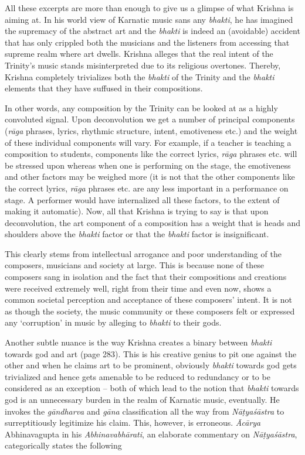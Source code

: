 All these excerpts are more than enough to give us a glimpse of what Krishna is aiming at. In his world view of Karnatic music sans any \textit{bhakti}, he has imagined the supremacy of the abstract art and the \textit{bhakti} is indeed an (avoidable) accident that has only crippled both the musicians and the listeners from accessing that supreme realm where art dwells. Krishna alleges that the real intent of the Trinity’s music stands misinterpreted due to its religious overtones. Thereby, Krishna completely trivializes both the \textit{bhakti} of the Trinity and the \textit{bhakti} elements that they have suffused in their compositions.

In other words, any composition by the Trinity can be looked at as a highly convoluted signal. Upon deconvolution we get a number of principal components (\textit{rāga} phrases, lyrics, rhythmic structure, intent, emotiveness etc.) and the weight of these individual components will vary. For example, if a teacher is teaching a composition to students, components like the correct lyrics, \textit{rāga} phrases etc. will be stressed upon whereas when one is performing on the stage, the emotiveness and other factors may be weighed more (it is not that the other components like the correct lyrics, \textit{rāga} phrases etc. are any less important in a performance on stage. A performer would have internalized all these factors, to the extent of making it automatic). Now, all that Krishna is trying to say is that upon deconvolution, the art component of a composition has a weight that is heads and shoulders above the \textit{bhakti} factor or that the \textit{bhakti} factor is insignificant.

This clearly stems from intellectual arrogance and poor understanding of the composers, musicians and society at large. This is because none of these composers sang in isolation and the fact that their compositions and creations were received extremely well, right from their time and even now, shows a common societal perception and acceptance of these composers’ intent. It is not as though the society, the music community or these composers felt or expressed any ‘corruption’ in music by alleging to \textit{bhakti} to their gods.

Another subtle nuance is the way Krishna creates a binary between \textit{bhakti} towards god and art (page 283). This is his creative genius to pit one against the other and when he claims art to be prominent, obviously \textit{bhakti} towards god gets trivialized and hence gets amenable to be reduced to redundancy or to be considered as an exception – both of which lead to the notion that \textit{bhakti} towards god is an unnecessary burden in the realm of Karnatic music, eventually. He invokes the \textit{gāndharva} and \textit{gāna} classification all the way from \textit{Nāṭyaśāstra} to surreptitiously legitimize his claim. This, however, is erroneous. \textit{Ācārya} Abhinavagupta in his \textit{Abhinavabhārati}, an elaborate commentary on \textit{Nāṭyaśāstra}, categorically states the following

